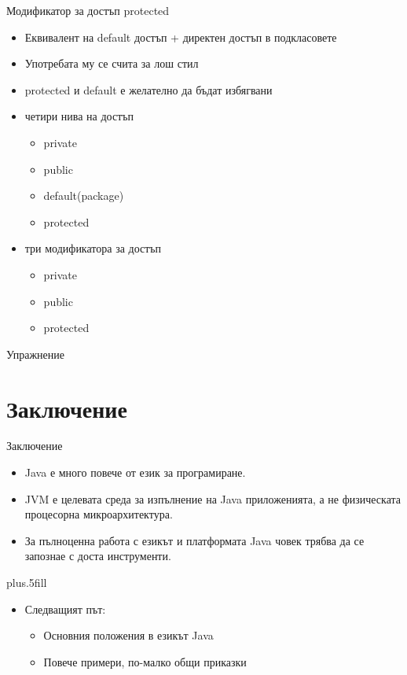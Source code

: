\documentclass{beamer}
\begin{document}
\begin{frame}{Модификатор за достъп protected}
  \transdissolve
  \begin{itemize}
  \item Еквивалент на default достъп + директен достъп в подкласовете
  \item Употребата му се счита за лош стил
  \item protected и default е желателно да бъдат избягвани
  \item четири нива на достъп
    \begin{itemize}
      \item private
      \item public
      \item default(package)
      \item protected
    \end{itemize}
  \item три модификатора за достъп
    \begin{itemize}
      \item private
      \item public
      \item protected
    \end{itemize}

  \end{itemize}
\end{frame}


\begin{frame}{Упражнение}
  \transdissolve
  
\end{frame}


\section*{Заключение}

\begin{frame}{Заключение}
  \transdissolve
  \begin{itemize}
  \item
    Java \alert{е много повече от език за програмиране}.
  \item
    JVM \alert{е целевата среда за изпълнение} на Java приложенията, а
    не физическата процесорна микроархитектура.
  \item
    За пълноценна работа с езикът и платформата Java човек трябва да
    се запознае с доста инструменти.
  \end{itemize}
  
  \vskip0pt plus.5fill
  \begin{itemize}
  \item
    Следващият път:
    \begin{itemize}
    \item
      Основния положения в езикът Java
    \item
      Повече примери, по-малко общи приказки
    \end{itemize}
  \end{itemize}
\end{frame}
\end{document}
